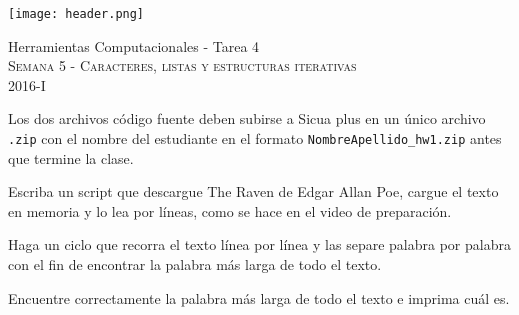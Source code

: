 \documentclass[11pt,letterpaper]{exam}
\begin{document}
\begin{center}

\texttt{[image: header.png]}

\vspace{1.0cm}
{\Large Herramientas Computacionales - Tarea 4} \\
\textsc{Semana 5 - Caracteres, listas y estructuras iterativas}\\
2016-I\\
\end{center}



\vspace{0.5cm}

\noindent
Los dos archivos c\'odigo fuente deben subirse a Sicua plus en un \'unico archivo
\verb".zip" con el nombre del estudiante en el formato \verb"NombreApellido_hw1.zip" antes que termine la clase.

\vspace{0.5cm}

\begin{questions}
 

Escriba un script que descargue The Raven de Edgar Allan Poe, cargue el texto en memoria y lo lea por l\'ineas, como se hace en el video de preparaci\'on.


Haga un ciclo que recorra el texto l\'inea por l\'inea y las separe palabra por palabra con el fin de encontrar la palabra m\'as larga de todo el texto. 


Encuentre correctamente la palabra m\'as larga de todo el texto e imprima cu\'al es.


\end{questions}
\end{document}
